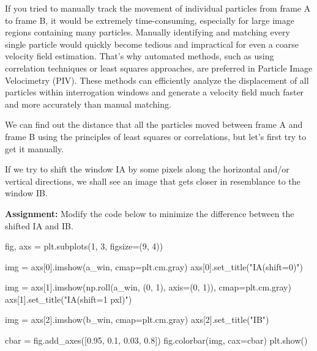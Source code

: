 \documentclass[
  english,
  letterpaper,
  numbers=noendperiod,
  DIV=13]{scrreprt}
\newenvironment{Shaded}{\begin{snugshade}}{\end{snugshade}}
\newcommand{\DecValTok}[1]{\textcolor[rgb]{0.68,0.00,0.00}{#1}}
\newcommand{\FloatTok}[1]{\textcolor[rgb]{0.68,0.00,0.00}{#1}}
\newcommand{\NormalTok}[1]{\textcolor[rgb]{0.00,0.23,0.31}{#1}}
\newcommand{\OperatorTok}[1]{\textcolor[rgb]{0.37,0.37,0.37}{#1}}
\newcommand{\StringTok}[1]{\textcolor[rgb]{0.13,0.47,0.30}{#1}}
\begin{document}
If you tried to manually track the movement of individual particles from
frame A to frame B, it would be extremely time-consuming, especially for
large image regions containing many particles. Manually identifying and
matching every single particle would quickly become tedious and
impractical for even a coarse velocity field estimation. That's why
automated methods, such as using correlation techniques or least squares
approaches, are preferred in Particle Image Velocimetry (PIV). These
methods can efficiently analyze the displacement of all particles within
interrogation windows and generate a velocity field much faster and more
accurately than manual matching.

We can find out the distance that all the particles moved between frame
A and frame B using the principles of least squares or correlations, but
let's first try to get it manually.

If we try to shift the window IA by some pixels along the horizontal
and/or vertical directions, we shall see an image that gets closer in
resemblance to the window IB.

\textbf{Assignment:} Modify the code below to minimize the difference
between the shifted IA and IB.

\begin{Shaded}
\begin{Highlighting}[]
\NormalTok{fig, axs }\OperatorTok{=}\NormalTok{ plt.subplots(}\DecValTok{1}\NormalTok{, }\DecValTok{3}\NormalTok{, figsize}\OperatorTok{=}\NormalTok{(}\DecValTok{9}\NormalTok{, }\DecValTok{4}\NormalTok{))}

\NormalTok{img }\OperatorTok{=}\NormalTok{ axs[}\DecValTok{0}\NormalTok{].imshow(a\_win, cmap}\OperatorTok{=}\NormalTok{plt.cm.gray)}
\NormalTok{axs[}\DecValTok{0}\NormalTok{].set\_title(}\StringTok{"IA(shift=0)"}\NormalTok{)}

\NormalTok{img }\OperatorTok{=}\NormalTok{ axs[}\DecValTok{1}\NormalTok{].imshow(np.roll(a\_win, (}\DecValTok{0}\NormalTok{, }\DecValTok{1}\NormalTok{), axis}\OperatorTok{=}\NormalTok{(}\DecValTok{0}\NormalTok{, }\DecValTok{1}\NormalTok{)), cmap}\OperatorTok{=}\NormalTok{plt.cm.gray)}
\NormalTok{axs[}\DecValTok{1}\NormalTok{].set\_title(}\StringTok{"IA(shift=1 pxl)"}\NormalTok{)}

\NormalTok{img }\OperatorTok{=}\NormalTok{ axs[}\DecValTok{2}\NormalTok{].imshow(b\_win, cmap}\OperatorTok{=}\NormalTok{plt.cm.gray)}
\NormalTok{axs[}\DecValTok{2}\NormalTok{].set\_title(}\StringTok{"IB"}\NormalTok{)}

\NormalTok{cbar }\OperatorTok{=}\NormalTok{ fig.add\_axes([}\FloatTok{0.95}\NormalTok{, }\FloatTok{0.1}\NormalTok{, }\FloatTok{0.03}\NormalTok{, }\FloatTok{0.8}\NormalTok{])}
\NormalTok{fig.colorbar(img, cax}\OperatorTok{=}\NormalTok{cbar)}
\NormalTok{plt.show()}
\end{Highlighting}
\end{Shaded}
\end{document}
